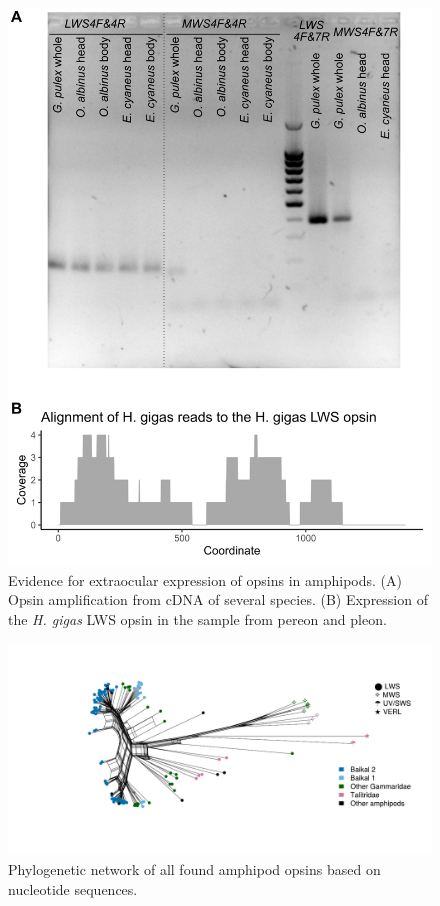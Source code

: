 \documentclass{article}
\begin{document}
\begin{figure}[H] 
	\includegraphics[scale=0.65]{./FigS4_cDNA_diff_body_parts.png}
	\caption{Evidence for extraocular expression of opsins in amphipods. (A) Opsin amplification from cDNA of several species. (B) Expression of the \textit{H. gigas} LWS opsin in the sample from pereon and pleon.} \end{figure}

\begin{figure}[H] 
	\includegraphics[width=\linewidth]{./FigS5_all_opsins_network.pdf}
	\caption{Phylogenetic network of all found amphipod opsins based on nucleotide sequences.} \end{figure}
\end{document}

